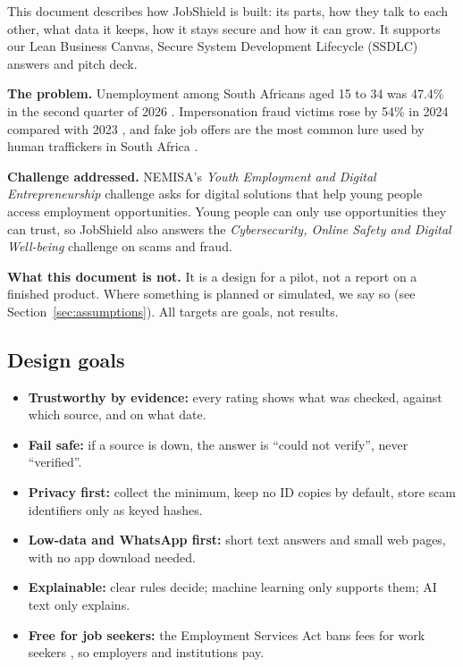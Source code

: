 \documentclass[11pt,a4paper]{article}
\begin{document}
\medskip
This document describes how JobShield is built: its parts, how they talk to each other, what data it keeps, how it stays secure and how it can grow. It supports our Lean Business Canvas, Secure System Development Lifecycle (SSDLC) answers and pitch deck.

\textbf{The problem.} Unemployment among South Africans aged 15 to 34 was 47.4\% in the second quarter of 2026 \cite{qlfs}. Impersonation fraud victims rose by 54\% in 2024 compared with 2023 \cite{safps}, and fake job offers are the most common lure used by human traffickers in South Africa \cite{nfn}.

\textbf{Challenge addressed.} NEMISA's \emph{Youth Employment and Digital Entrepreneurship} challenge asks for digital solutions that help young people access employment opportunities. Young people can only use opportunities they can trust, so JobShield also answers the \emph{Cybersecurity, Online Safety and Digital Well-being} challenge on scams and fraud.

\textbf{What this document is not.} It is a design for a pilot, not a report on a finished product. Where something is planned or simulated, we say so (see Section~\ref{sec:assumptions}). All targets are goals, not results.

\subsection{Design goals}
\begin{itemize}
  \item \textbf{Trustworthy by evidence:} every rating shows what was checked, against which source, and on what date.
  \item \textbf{Fail safe:} if a source is down, the answer is ``could not verify'', never ``verified''.
  \item \textbf{Privacy first:} collect the minimum, keep no ID copies by default, store scam identifiers only as keyed hashes.
  \item \textbf{Low-data and WhatsApp first:} short text answers and small web pages, with no app download needed.
  \item \textbf{Explainable:} clear rules decide; machine learning only supports them; AI text only explains.
  \item \textbf{Free for job seekers:} the Employment Services Act bans fees for work seekers \cite{esa}, so employers and institutions pay.
\end{itemize}
\end{document}
